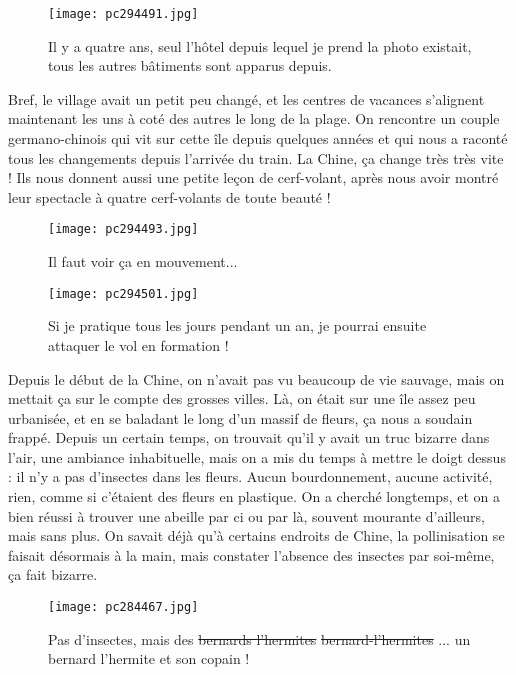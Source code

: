 \documentclass{book}
\begin{document}
\begin{figure}[h]
\centering
\texttt{[image: pc294491.jpg]}
\caption*{Il y a quatre ans, seul l'hôtel depuis lequel je prend la photo existait, tous les autres bâtiments sont apparus depuis.}
\end{figure}

Bref, le village avait un petit peu changé, et les centres de vacances s'alignent maintenant les uns à coté des autres le long de la plage. On rencontre un couple germano-chinois qui vit sur cette île depuis quelques années et qui nous a raconté tous les changements depuis l'arrivée du train. La Chine, ça change très très vite ! Ils nous donnent aussi une petite leçon de cerf-volant, après nous avoir montré leur spectacle à quatre cerf-volants de toute beauté !


\begin{figure}[h]
\centering
\texttt{[image: pc294493.jpg]}
\caption*{Il faut voir ça en mouvement...}
\end{figure}


\begin{figure}[h]
\centering
\texttt{[image: pc294501.jpg]}
\caption*{Si je pratique tous les jours pendant un an, je pourrai ensuite attaquer le vol en formation !}
\end{figure}

Depuis le début de la Chine, on n'avait pas vu beaucoup de vie sauvage, mais on mettait ça sur le compte des grosses villes. Là, on était sur une île assez peu urbanisée, et en se baladant le long d'un massif de fleurs, ça nous a soudain frappé. Depuis un certain temps, on trouvait qu'il y avait un truc bizarre dans l'air, une ambiance inhabituelle, mais on a mis du temps à mettre le doigt dessus : il n'y a pas d'insectes dans les fleurs. Aucun bourdonnement, aucune activité, rien, comme si c'étaient des fleurs en plastique. On a cherché longtemps, et on a bien réussi à trouver une abeille par ci ou par là, souvent mourante d'ailleurs, mais sans plus. On savait déjà qu'à certains endroits de Chine, la pollinisation se faisait désormais à la main, mais constater l'absence des insectes par soi-même, ça fait bizarre.


\begin{figure}[h]
\centering
\texttt{[image: pc284467.jpg]}
\caption*{Pas d'insectes, mais des \st{bernards l'hermites} \st{bernard-l'hermites} ... un bernard l'hermite et son copain !}
\end{figure}
\end{document}
